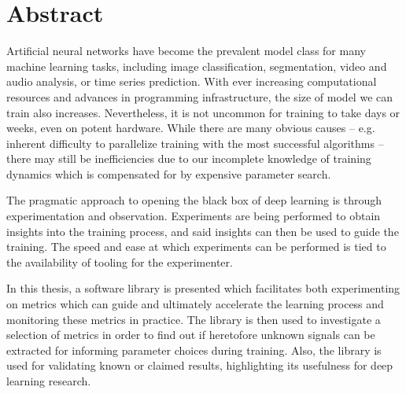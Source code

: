 \chapter*{Abstract}

Artificial neural networks have become the prevalent model class for many
machine learning tasks, including image classification, segmentation, video and
audio analysis, or time series prediction. With ever increasing computational
resources and advances in programming infrastructure, the size of model we can
train also increases. Nevertheless, it is not uncommon for training to take days
or weeks, even on potent hardware. While there are many obvious causes -- e.g.
inherent difficulty to parallelize training with the most successful algorithms
-- there may still be inefficiencies due to our incomplete knowledge of training
dynamics which is compensated for by expensive parameter search.

The pragmatic approach to opening the black box of deep learning is
through experimentation and observation. Experiments are being performed to
obtain insights into the training process, and said insights can then be used to
guide the training.  The speed and ease at which experiments can be performed is
tied to the availability of tooling for the experimenter.

In this thesis, a software library is presented which facilitates both
experimenting on metrics which can guide and ultimately accelerate the learning
process and monitoring these metrics in practice. The library is then used to
investigate a selection of metrics in order to find out if heretofore unknown
signals can be extracted for informing parameter choices during training. Also,
the library is used for validating known or claimed results, highlighting its
usefulness for deep learning research.

